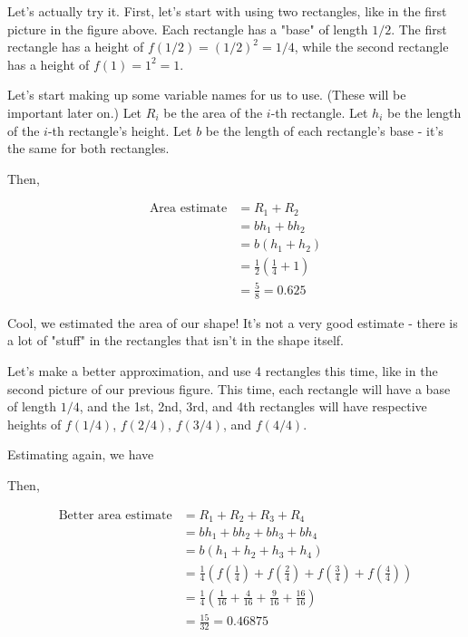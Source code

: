 \documentclass{article}
\begin{document}

Let's actually try it. First, let's start with using two rectangles, like in the first picture in the figure above. Each rectangle has a "base" of length $1/2$. The first rectangle has a height of $f(1/2) = (1/2)^2 = 1/4$, while the second rectangle has a height of $f(1) = 1^2 = 1$. 

Let's start making up some variable names for us to use. (These will be important later on.) Let $R_{i}$ be the area of the $i$-th rectangle. Let $h_{i}$ be the length of the $i$-th rectangle's height. Let $b$ be the length of each rectangle's base - it's the same for both rectangles.

Then,  

\begin{align*}
\text{Area estimate} &= R_1 + R_2 \\
&= b h_1 + b h_2 \\
&= b (h_1 + h_2) \\
&= \frac{1}{2} \left( \frac{1}{4} + 1 \right) \\
&= \frac{5}{8} = 0.625
\end{align*}

Cool, we estimated the area of our shape! It's not a very good estimate - there is a lot of "stuff" in the rectangles that isn't in the shape itself.

Let's make a better approximation, and use 4 rectangles this time, like in the second picture of our previous figure. This time, each rectangle will have a base of length $1/4$, and the 1st, 2nd, 3rd, and 4th rectangles will have respective heights of $f(1/4)$, $f(2/4)$, $f(3/4)$, and $f(4/4)$. 


Estimating again, we have

Then,  

\begin{align*}
\text{Better area estimate} &= R_1 + R_2 + R_3 + R_4 \\
&= b h_1 + b h_2 + b h_3 + b h_4 \\
&= b (h_1 + h_2 + h_3 + h_4) \\
&= \frac{1}{4} \left( f(\frac{1}{4}) + f(\frac{2}{4}) + f(\frac{3}{4}) + f(\frac{4}{4}) \right) \\
&= \frac{1}{4} \left( \frac{1}{16} + \frac{4}{16} + \frac{9}{16} + \frac{16}{16} \right) \\
&= \frac{15}{32} = 0.46875
\end{align*}
\end{document}

